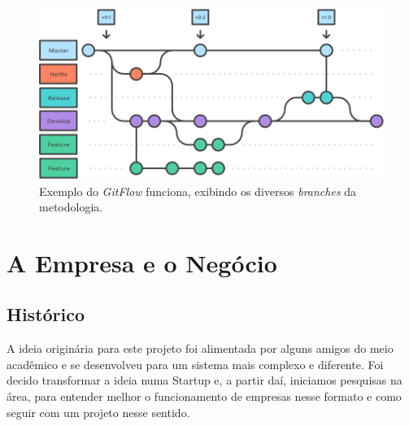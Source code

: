 \documentclass[12pt,a4paper,twoside,hyphens,english,brazil]{abntex2}
\begin{document}

\begin{figure}[!hb]
	\centering
	\includegraphics[width=0.8\linewidth]{imagens/gitflow-horizontal.png}
	\caption{Exemplo do \emph{GitFlow} funciona, exibindo os diversos \emph{branches} da metodologia.}
\end{figure}


\chapter{A Empresa e o Negócio}


\section{Histórico}
A ideia originária para este projeto foi alimentada por alguns amigos do meio acadêmico e se desenvolveu para um sistema mais complexo e diferente. Foi decido transformar a ideia numa Startup\footnotemark{} e, a partir daí, iniciamos pesquisas na área, para entender melhor o funcionamento de empresas nesse formato e como seguir com um projeto nesse sentido.
\end{document}
